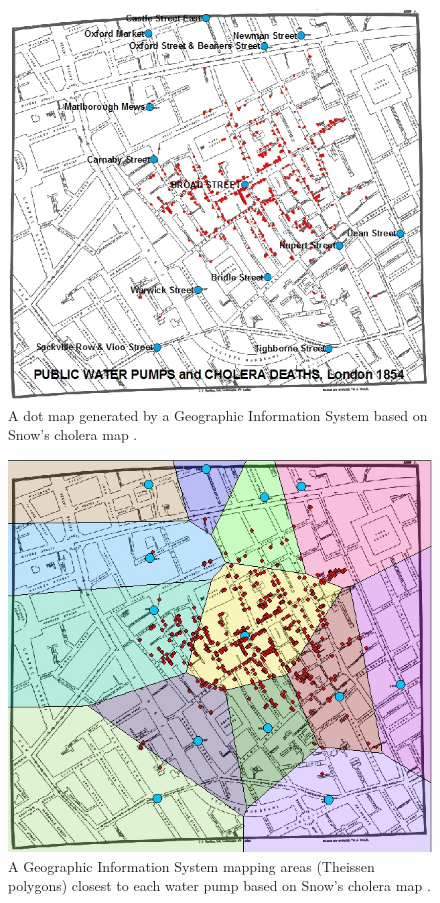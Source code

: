 \documentclass[12pt]{article}
\begin{document}
\begin{figure}
\centering
\includegraphics[scale=1.0]{images/gis}
\caption{A dot map generated by a Geographic Information System based on Snow's cholera map \cite{udel2}.}
\label{fig:gis}
\end{figure}

\begin{figure}
\centering
\includegraphics[scale=1.0]{images/gis_1}
\caption{ A Geographic Information System mapping areas (Theissen polygons) closest to each water pump based on Snow's cholera map \cite{udel2}.}
\label{fig:gis1}
\end{figure}
\end{document}
